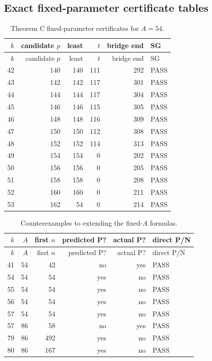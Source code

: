 \subsection{Exact fixed-parameter certificate tables}
\begin{longtable}{rrrrrl}
\caption{Theorem C fixed-parameter certificates for $A=54$.}\label{tab:Ccert}\\
\toprule $k$ & candidate $p$ & least & $t$ & bridge end & SG \\
\midrule\endfirsthead\toprule $k$ & candidate $p$ & least & $t$ & bridge end & SG \\
\midrule\endhead
42 & 140 & 140 & 111 & 292 & PASS \\
43 & 142 & 142 & 117 & 301 & PASS \\
44 & 144 & 144 & 117 & 304 & PASS \\
45 & 146 & 146 & 115 & 305 & PASS \\
46 & 148 & 148 & 116 & 309 & PASS \\
47 & 150 & 150 & 112 & 308 & PASS \\
48 & 152 & 152 & 114 & 313 & PASS \\
49 & 154 & 154 & 0 & 202 & PASS \\
50 & 156 & 156 & 0 & 205 & PASS \\
51 & 158 & 158 & 0 & 208 & PASS \\
52 & 160 & 160 & 0 & 211 & PASS \\
53 & 162 & 54 & 0 & 214 & PASS \\
\bottomrule\end{longtable}

\begin{longtable}{rrrrrl}
\caption{Counterexamples to extending the fixed-$A$ formulas.}\label{tab:Cfail}\\
\toprule $k$ & $A$ & first $n$ & predicted P? & actual P? & direct P/N \\
\midrule\endfirsthead\toprule $k$ & $A$ & first $n$ & predicted P? & actual P? & direct P/N \\
\midrule\endhead
41 & 54 & 42 & no & yes & PASS \\
54 & 54 & 54 & yes & no & PASS \\
55 & 54 & 54 & yes & no & PASS \\
56 & 54 & 54 & yes & no & PASS \\
57 & 54 & 54 & yes & no & PASS \\
57 & 86 & 58 & no & yes & PASS \\
79 & 86 & 492 & yes & no & PASS \\
80 & 86 & 167 & yes & no & PASS \\
\bottomrule\end{longtable}
